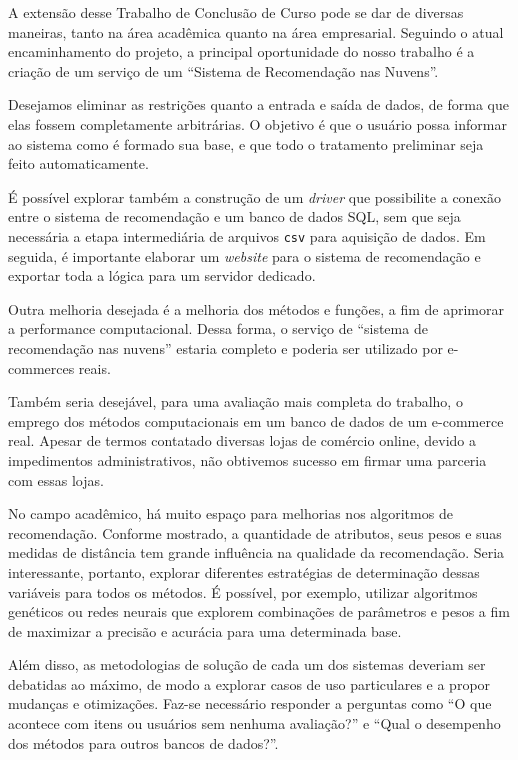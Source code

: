 A extensão desse Trabalho de Conclusão de Curso pode se dar de diversas maneiras, tanto na área acadêmica quanto na área empresarial. Seguindo o atual encaminhamento do projeto, a principal oportunidade do nosso trabalho é a criação de um serviço de um ``Sistema de Recomendação nas Nuvens''. 

Desejamos eliminar as restrições quanto a entrada e saída de dados, de forma que elas fossem completamente arbitrárias. O objetivo é que o usuário possa informar ao sistema como é formado sua base, e que todo o tratamento preliminar seja feito automaticamente. 

É possível explorar também a construção de um \textit{driver} que possibilite a conexão entre o sistema de recomendação e um banco de dados SQL, sem que seja necessária a etapa intermediária de arquivos \texttt{csv} para aquisição de dados. Em seguida, é importante elaborar um \textit{website} para o sistema de recomendação e exportar toda a lógica para um servidor dedicado. 

Outra melhoria desejada é a melhoria dos métodos e funções, a fim de aprimorar a performance computacional. Dessa forma, o serviço de ``sistema de recomendação nas nuvens'' estaria completo e poderia ser utilizado por e-commerces reais.

Também seria desejável, para uma avaliação mais completa do trabalho, o emprego dos métodos computacionais em um banco de dados de um e-commerce real. Apesar de termos contatado diversas lojas de comércio online, devido a impedimentos administrativos, não obtivemos sucesso em firmar uma parceria com essas lojas. 

No campo acadêmico, há muito espaço para melhorias nos algoritmos de recomendação. Conforme mostrado, a quantidade de atributos, seus pesos e suas medidas de distância tem grande influência na qualidade da recomendação. Seria interessante, portanto, explorar diferentes estratégias de determinação dessas variáveis para todos os métodos. É possível, por exemplo, utilizar algoritmos genéticos ou redes neurais que explorem combinações de parâmetros e pesos a fim de maximizar a precisão e acurácia para uma determinada base.

Além disso, as metodologias de solução de cada um dos sistemas deveriam ser debatidas ao máximo, de modo a explorar casos de uso particulares e a propor mudanças e otimizações. Faz-se necessário responder a perguntas como ``O que acontece com itens ou usuários sem nenhuma avaliação?'' e ``Qual o desempenho dos métodos para outros bancos de dados?''. 